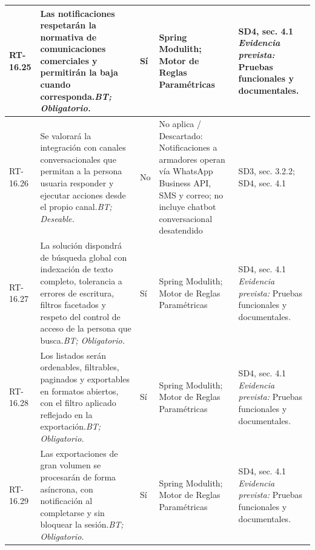 \begin{paginaHorizontalSynaptix}
\begin{longtable}{|L{0.09\AnchoMatrizTDoce}|L{0.385\AnchoMatrizTDoce}|L{0.065\AnchoMatrizTDoce}|L{0.18\AnchoMatrizTDoce}|L{0.28\AnchoMatrizTDoce}|}
RT-\allowbreak{}16.\allowbreak{}25 &
Las notificaciones respetarán la normativa de comunicaciones comerciales y permitirán la baja cuando corresponda.\newline\textit{BT; Obligatorio.} &
Sí &
Spring Modulith; Motor de Reglas Paramétricas &
SD4, sec. 4.1 \newline\textit{Evidencia prevista:} Pruebas funcionales y documentales. \\ \hline

RT-\allowbreak{}16.\allowbreak{}26 &
Se valorará la integración con canales conversacionales que permitan a la persona usuaria responder y ejecutar acciones desde el propio canal.\newline\textit{BT; Deseable.} &
No &
No aplica / Descartado: Notificaciones a armadores operan vía WhatsApp Business API, SMS y correo; no incluye chatbot conversacional desatendido &
SD3, sec. 3.2.2; SD4, sec. 4.1 \\ \hline

RT-\allowbreak{}16.\allowbreak{}27 &
La solución dispondrá de búsqueda global con indexación de texto completo, tolerancia a errores de escritura, filtros facetados y respeto del control de acceso de la persona que busca.\newline\textit{BT; Obligatorio.} &
Sí &
Spring Modulith; Motor de Reglas Paramétricas &
SD4, sec. 4.1 \newline\textit{Evidencia prevista:} Pruebas funcionales y documentales. \\ \hline

RT-\allowbreak{}16.\allowbreak{}28 &
Los listados serán ordenables, filtrables, paginados y exportables en formatos abiertos, con el filtro aplicado reflejado en la exportación.\newline\textit{BT; Obligatorio.} &
Sí &
Spring Modulith; Motor de Reglas Paramétricas &
SD4, sec. 4.1 \newline\textit{Evidencia prevista:} Pruebas funcionales y documentales. \\ \hline

RT-\allowbreak{}16.\allowbreak{}29 &
Las exportaciones de gran volumen se procesarán de forma asíncrona, con notificación al completarse y sin bloquear la sesión.\newline\textit{BT; Obligatorio.} &
Sí &
Spring Modulith; Motor de Reglas Paramétricas &
SD4, sec. 4.1 \newline\textit{Evidencia prevista:} Pruebas funcionales y documentales. \\ \hline


\end{longtable}
\end{paginaHorizontalSynaptix}
